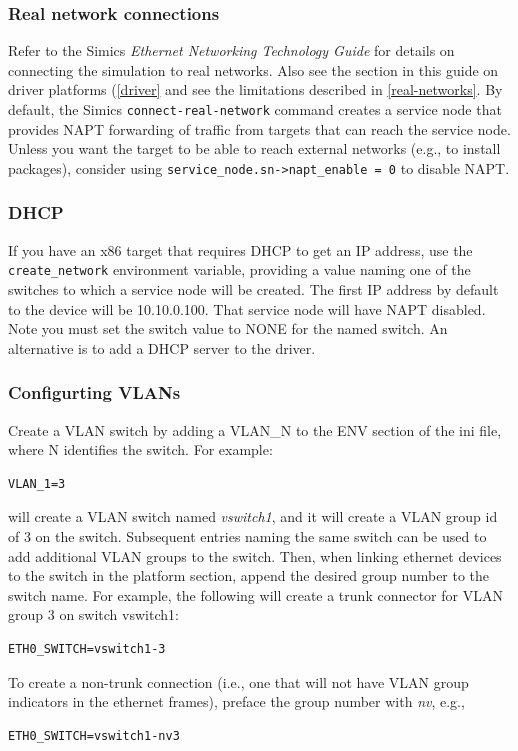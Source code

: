 \documentclass[titlepage]{article}
\begin{document}
\subsubsection{Real network connections}
Refer to the Simics \textit{Ethernet Networking Technology Guide} for details on connecting the simulation to real networks.
Also see the section in this guide on driver platforms (\ref{driver} and see the limitations described in \ref{real-networks}.  
By default, the Simics {\tt connect-real-network} command creates a service
node that provides NAPT forwarding of traffic from targets that can reach the service node.  Unless you want the target to be able to
reach external networks (e.g., to install packages), consider using {\tt service\_node.sn->napt\_enable = 0} to disable NAPT.

\subsubsection{DHCP}
\label{DHCP}
If you have an x86 target that requires DHCP to get an IP address, use the {\tt create\_network} environment variable, providing a value
naming one of the switches to which a service node will be created.  The first IP address by default to the device will be 10.10.0.100.
That service node will have NAPT disabled.  Note you must set the switch value to NONE for the named switch.  An alternative is to add
a DHCP server to the driver.

\subsubsection{Configurting VLANs}
Create a VLAN switch by adding a {VLAN\_N} to the ENV section of the ini file, where N identifies the switch.  For example:
\begin{verbatim}
VLAN_1=3
\end{verbatim}
\noindent will create a VLAN switch named \textit{vswitch1}, and it will create a VLAN group id of 3 on the switch.  Subsequent entries naming the same switch
can be used to add additional VLAN groups to the switch.  Then, when linking ethernet devices to the switch in the platform section, append the desired group 
number to the switch name.  For example, the following will create a trunk connector for VLAN group 3 on switch vswitch1:
\begin{verbatim}
ETH0_SWITCH=vswitch1-3
\end{verbatim}
\noindent To create a non-trunk connection (i.e., one that will not have VLAN group indicators in the ethernet frames), preface the group number with 
\textit{nv}, e.g.,
\begin{verbatim}
ETH0_SWITCH=vswitch1-nv3
\end{verbatim}
\end{document}
